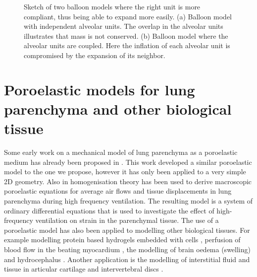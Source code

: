 \begin{figure}[h]
\centering
\caption{Sketch of two balloon models where the right unit is more compliant, thus being able to expand more easily. (a) Balloon model with independent alveolar units. The overlap in the alveolar units illustrates that mass is not conserved. (b) Balloon model where the alveolar units are coupled. Here the inflation of each alveolar unit is compromised by the expansion of its neighbor.}
\label{fig:balloons}
\end{figure}



\section{Poroelastic models for lung parenchyma and other biological tissue}
Some early work on a mechanical model of lung parenchyma as a poroelastic medium has already been proposed in \citet{kowalczyk1993mechanical}. This work developed a similar poroelastic model to the one we propose, however it has only been applied to a very simple 2D geometry. Also in \citet{owen2001mechanics} homogenisation theory has been used to derive macroscopic poroelastic equations for average air flows and tissue displacements in lung parenchyma during high frequency ventilation. The resulting model is a system of ordinary differential equations that is used to investigate the effect of high-frequency ventilation on strain in the parenchymal tissue. The use of a poroelastic model has also been applied to modelling other biological tissues. For example modelling protein based hydrogels embedded with cells \citep{galie2011linear}, perfusion of blood flow in the beating myocardium \citep{chapelle2010poroelastic,cookson2011novel}, the modelling of brain oedema (swelling) \citep{li2010three} and hydrocephalus \citep{wirth2006axisymmetric}. Another application is the modelling of interstitial fluid and tissue in articular cartilage and intervertebral discs \citep{mow1980biphasic,holmes1990nonlinear,galbusera2011comparison}.




